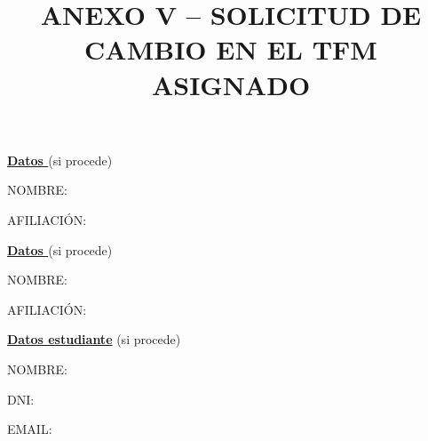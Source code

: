 \documentclass[11pt,a4paper,oneside]{article}
\title{ANEXO V -- SOLICITUD DE CAMBIO EN EL TFM ASIGNADO}
\date{}
\newcommand{\AnnexNA}{\hl{N/D}}
\begin{document}
{\normalsize
\setlength{\parindent}{0pt}
\maketitle

\thispagestyle{empty}

\vspace*{\fill}

\noindent\textbf{\underline{Datos \wordTutorDelOrDeLa{} \wordDirectorOrdirectora{} \wordAcademicoOrAcademica{}}} (si procede)

\vspace{0.25cm}

\hspace*{0.5cm}NOMBRE: \myAcademicTutorFullName

\vspace{0.25cm}

\hspace*{0.5cm}AFILIACIÓN: \AcademicTutorAffiliation

\vspace{0.4cm}

\noindent\textbf{\underline{Datos \wordCoTutorDelOrDeLa{} \wordCoDirectorOrCoDirectora{}}} (si procede)

\vspace{0.25cm}

\hspace*{0.5cm}NOMBRE:
\ifCoTutorPresent{\myCoTutorFullName}{\AnnexNA}

\vspace{0.25cm}

\hspace*{0.5cm}AFILIACIÓN:
\ifCoTutorPresent{\AcademicCotutorAffiliation}{\AnnexNA}

\vspace{0.4cm}

\noindent\textbf{\underline{Datos \wordAutorDelOrDeLa{} estudiante}} (si procede)

\vspace{0.25cm}

\hspace*{0.5cm}NOMBRE: \myAuthorFullName

\vspace{0.25cm}

\hspace*{0.5cm}DNI: \myAuthorDNI

\vspace{0.25cm}

\hspace*{0.5cm}EMAIL: \myAuthorEmail

}
\end{document}
